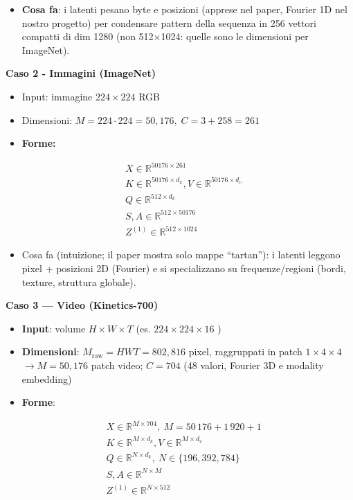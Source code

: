 \documentclass[
  11pt,
]{article}
\begin{document}
\begin{itemize}
\item
  \textbf{Cosa fa}: i latenti pesano byte e posizioni (apprese nel paper, Fourier 1D nel nostro progetto) per
  condensare pattern della sequenza in 256 vettori compatti di dim 1280 (non 512$\times$1024: quelle sono le dimensioni per ImageNet).
\end{itemize}

\textbf{Caso 2 - Immagini (ImageNet)}

\begin{itemize}
\item
  Input: immagine \(224 \times 224\) RGB
\item
  Dimensioni: \(M = 224 \cdot 224 = 50{,}176,\; C = 3 + 258 = 261\)
\item
  \textbf{Forme:}
\end{itemize}

\[\begin{matrix}
 & X \in \mathbb{R}^{50176 \times 261} \\
 & K \in \mathbb{R}^{50176 \times d_{k}},V \in \mathbb{R}^{50176 \times d_{v}} \\
 & Q \in \mathbb{R}^{512 \times d_{k}} \\
 & S,A \in \mathbb{R}^{512 \times 50176} \\
 & Z^{(1)} \in \mathbb{R}^{512 \times 1024}
\end{matrix}\]

\begin{itemize}
\item
  Cosa fa (intuizione; il paper mostra solo mappe ``tartan''): i latenti leggono pixel + posizioni 2D (Fourier) e si
  specializzano su frequenze/regioni (bordi, texture, struttura
  globale).
\end{itemize}

\textbf{Caso 3 --- Video (Kinetics-700)}

\begin{itemize}
\item
  \textbf{Input}: volume \(H \times W \times T\) (es.
  \(224 \times 224 \times 16\) )
\item
  \textbf{Dimensioni}:
  \(M_{\text{raw}} = HWT = 802{,}816\) pixel, raggruppati in patch \(1\times4\times4\)
  \(\rightarrow M = 50{,}176\) patch video; \(C = 704\) (48 valori, Fourier 3D e modality embedding)
\item
  \textbf{Forme}:
\end{itemize}

\[\begin{matrix}
 & X \in \mathbb{R}^{M \times 704},\ M = 50\,176 + 1\,920 + 1 \\
 & K \in \mathbb{R}^{M \times d_{k}},V \in \mathbb{R}^{M \times d_{v}} \\
 & Q \in \mathbb{R}^{N \times d_{k}},\ N \in \{196, 392, 784\} \\
 & S,A \in \mathbb{R}^{N \times M} \\
 & Z^{(1)} \in \mathbb{R}^{N \times 512}
\end{matrix}\]
\end{document}
